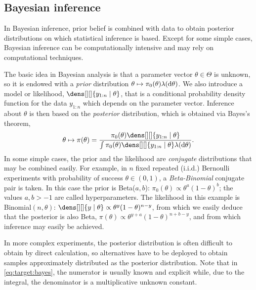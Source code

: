 \documentclass[english,graybox,envcountchap,envcountsame,sectrefs,shortlabels]{svmono}
\theoremstyle{style}
\begin{document}
\subsection{Bayesian inference}
In  Bayesian inference, prior belief  is combined with
data to obtain posterior distributions on which statistical inference is based.
Except for some simple cases, Bayesian inference can be computationally
intensive and may rely on  computational techniques.

The basic idea in Bayesian analysis is that a parameter vector $ \theta \in \Theta$ is unknown, so it is endowed with a \emph{prior} distribution
$\theta\mapsto \pi_0( \theta)\lambda(\mathrm{d} \theta)$.  We also
introduce a model or likelihood, $\dens[][]{ y_{1:n} \mid \theta}$, that is
a conditional probability density function for the data $y_{1:n}$ which depends on the parameter vector.
Inference about $ \theta$ is then based on the \emph{posterior}
distribution, which is obtained via Bayes's theorem,
\begin{equation} \label{eq:target:bayes}
\theta \mapsto \pi(\theta) =\frac{\pi_0( \theta) \dens[][]{ y_{1:n} \mid \theta}}{\int \pi_0( \theta) \dens[][]{ y_{1:n} \mid \theta} \lambda(\rmd \theta)}.
\end{equation}
  In some simple cases, the prior  and
the likelihood are \emph{conjugate}  distributions that may be combined easily.
For example, in $n$ fixed repeated (i.i.d.) Bernoulli experiments with probability of success $\theta\in(0,1)$,
a \emph{Beta-Binomial} conjugate pair is taken.  In this case the prior is
Beta($a,b$):
$\pi_0(\theta) \propto \theta^{a} (1-\theta)^{b}$; the values $a,b > -1$  are called
hyperparameters. The likelihood in this example is
Binomial$(n,\theta)$:
$\dens[][]{ y \mid \theta} \propto \theta^y (1-\theta)^{n-y}$, from which
we easily deduce that the
posterior is also Beta,
$\pi ( \theta ) \propto \theta^{y+a}(1-\theta)^{n+b-y }
$, and from which inference may easily be achieved.

In more complex experiments, the posterior distribution is often difficult to obtain by direct calculation,
so alternatives have to be deployed to obtain samples approximately distributed as the posterior distribution. Note that in \eqref{eq:target:bayes}, the numerator is usually known and explicit while, due to the integral, the denominator is a multiplicative unknown constant.  
\end{document}

